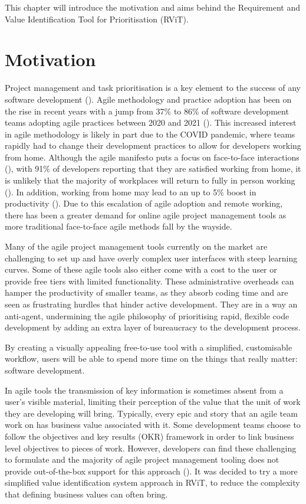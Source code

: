 \documentclass[l4proj.tex]{subfiles}
\begin{document}
  

This chapter will introduce the motivation and aims behind the Requirement and Value Identification Tool for Prioritisation (RViT).

\section{Motivation}

Project management and task prioritisation is a key element to the success of any software development (\cite{Verner2005}). Agile methodology and practice adoption has been on the rise in recent years with a jump from 37$\%$ to 86$\%$ of software development teams adopting agile practices between 2020 and 2021 (\cite{Knaster2023}). This increased interest in agile methodology is likely in part due to the COVID pandemic, where teams rapidly had to change their development practices to allow for developers working from home.   Although the agile manifesto puts a focus on face-to-face interactions (\cite{Kent2001}), with 91$\%$ of developers reporting that they are satisfied working from home, it is unlikely that the majority of workplaces will return to fully in person working (\cite{Ramírez2022}). In addition, working from home may lead to an up to 5$\%$ boost in productivity (\cite{Barrero2021}). Due to this escalation of agile adoption and remote working, there has been a greater demand for online agile project management tools as more traditional face-to-face agile methods fall by the wayside.

Many of the agile project management tools currently on the market are challenging to set up and have overly complex user interfaces with steep learning curves. Some of these agile tools also either come with a cost to the user or provide free tiers with limited functionality. These administrative overheads can hamper the productivity of smaller teams, as they absorb coding time and are seen as frustrating hurdles that hinder active development. They are in a way an anti-agent, undermining the agile philosophy of prioritising rapid, flexible code development by adding an extra layer of bureaucracy to the development process.

By creating a visually appealing free-to-use tool with a simplified, customisable workflow, users will be able to spend more time on the things that really matter: software development.

In agile tools the transmission of key information is sometimes absent from a user's visible material, limiting their perception of the value that the unit of work they are developing will bring. Typically, every epic and story that an agile team work on has business value associated with it. Some development teams choose to follow the objectives and key results (OKR) framework in order to link business level objectives to pieces of work. However, developers can find these challenging to formulate and the majority of agile project management tooling does not provide out-of-the-box support for this approach (\cite{Stray2022}). It was decided to try a more simplified value identification system approach in RViT, to reduce the complexity that defining business values can often bring.
\end{document}
